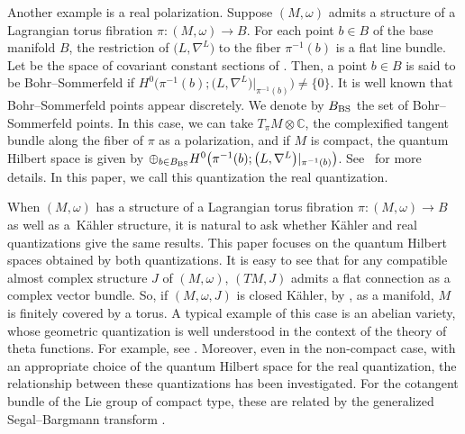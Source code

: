 \documentclass[pdftex]{sigma}
\numberwithin{equation}{section}
\newcommand{\C}{\mathbb{C}}
\begin{document}
Another example is a real polarization. Suppose $(M,\omega)$ admits a structure of a Lagrangian torus fibration $\pi\colon (M,\omega)\to B$. For each point $b\in B$ of the base manifold $B$, the restriction  of $\bigl(L,\nabla^L\bigr)$ to the fiber $\pi^{-1}(b)$ is a flat line bundle. Let  be the space of covariant constant sections of . Then, a point $b\in B$ is said to be Bohr--Sommerfeld if $H^0\bigl(\pi^{-1}(b); \bigl(L,\nabla^L\bigr)|_{\pi^{-1}(b)}\bigr)\not=\{ 0\}$. It is well known that Bohr--Sommerfeld points appear discretely. We denote by $B_{\rm BS}$ the set of Bohr--Sommerfeld points. In this case, we can take $T_\pi M\otimes \C $, the complexified tangent bundle along the fiber of $\pi$ as a polarization, and if $M$ is compact, the quantum Hilbert space is given by $\oplus_{b\in B_{\rm BS}}H^0\bigl(\pi^{-1}(b); \bigl(L,\nabla^L\bigr)|_{\pi^{-1}(b)}\bigr)$. See~\cite{Sn} for more details. In this paper, we call this quantization the real quantization.

When $(M,\omega)$ has a structure of a Lagrangian torus fibration $\pi\colon (M,\omega)\to B$ as well as a~K\"ahler structure,
it is natural to ask whether K\"ahler and real quantizations give the same results. This paper focuses on the quantum Hilbert spaces obtained by both quantizations.
It is easy to see that for any compatible almost complex structure $J$ of $(M,\omega)$, $(TM,J)$ admits a flat connection as a complex vector bundle. So, if $(M,\omega ,J)$ is closed K\"ahler, by \cite[Exemples~12.5.2\,(ii)]{MR0278248}, as a manifold, $M$ is finitely covered by a torus. A typical example of this case is an abelian variety, whose geometric quantization is well understood in the context of the theory of theta functions. For example, see \cite{BMN}. Moreover, even in the non-compact case, with an appropriate choice of the quantum Hilbert space for the real quantization, the relationship between these quantizations has been investigated. For the cotangent bundle of the Lie group of compact type, these are related by the generalized Segal--Bargmann transform \cite{MR1892462}.
\end{document}
